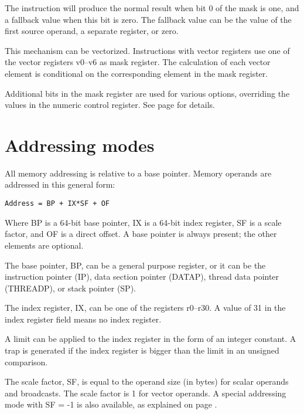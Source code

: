 \documentclass[forwardcom.tex]{subfiles}
\begin{document}
The instruction will produce the normal result when bit 0 of the mask is one, and a fallback value when this bit is zero. The fallback value can be the value of the first source operand, a separate register, or zero.
\vspace{2mm}

This mechanism can be vectorized. Instructions with vector registers use one of the vector registers v0--v6 as mask register. The calculation of each vector element is conditional on the corresponding element in the mask register.
\vspace{2mm}

Additional bits in the mask register are used for various options, overriding the values in the numeric control register. See page \pageref{table:maskBits} for details.

\section{Addressing modes}
All memory addressing is relative to a base pointer. Memory operands are addressed in this general form:

\begin{lstlisting}
Address = BP + IX*SF + OF
\end{lstlisting}

Where BP is a 64-bit base pointer, IX is a 64-bit index register, SF is a scale factor, and OF is a direct offset. A base pointer is always present; the other elements are optional. 
\vspace{2mm}

The base pointer, BP, can be a general purpose register, or it can be the 
instruction pointer (IP), data section pointer (DATAP), thread data pointer (THREADP), 
or stack pointer (SP).
\vspace{2mm}

The index register, IX, can be one of the registers r0--r30. A value of 31 in the index register field means no index register.
\vspace{2mm}

A limit can be applied to the index register in the form of an integer constant. A trap is generated if the index register is bigger than the limit in an unsigned comparison.
\vspace{2mm}

The scale factor, SF, is equal to the operand size (in bytes) for scalar operands and broadcasts. The scale factor is 1 for vector operands. A special addressing mode with 
SF = -1 
is also available, as explained on page \pageref{vectorLoops}.
\vspace{2mm}
\end{document}
